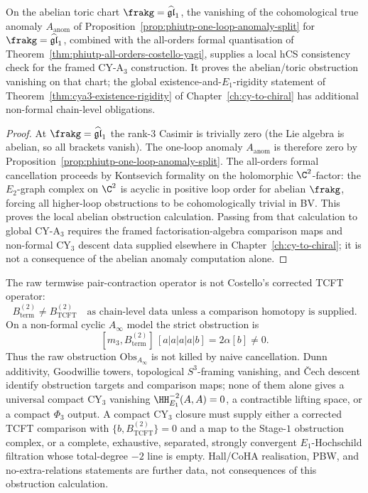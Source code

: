 \begin{corollary}
\label{cor:phiutp-cya3-anomaly-cancellation}
On the abelian toric chart $\frakg=\widehat{\mathfrak{gl}}_1$, the
vanishing of the cohomological true anomaly $A_{\mathrm{anom}}$ of
Proposition~\ref{prop:phiutp-one-loop-anomaly-split} for
$\frakg = \widehat{\mathfrak{gl}}_1$, combined with the all-orders
formal quantisation of Theorem~\ref{thm:phiutp-all-orders-costello-yagi},
supplies a local hCS consistency check for the framed CY-A$_3$
construction. It proves the abelian/toric obstruction vanishing on
that chart; the global existence-and-$E_1$-rigidity statement of
Theorem~\ref{thm:cya3-existence-rigidity} of
Chapter~\ref{ch:cy-to-chiral} has additional non-formal chain-level
obligations.
\end{corollary}

\begin{proof}
At $\frakg = \widehat{\mathfrak{gl}}_1$ the rank-$3$ Casimir is
trivially zero (the Lie algebra is abelian, so all brackets vanish).
The one-loop anomaly $A_{\mathrm{anom}}$ is therefore zero by
Proposition~\ref{prop:phiutp-one-loop-anomaly-split}. The all-orders
formal cancellation proceeds by Kontsevich formality on the holomorphic
$\C^2$-factor: the $E_2$-graph complex on $\C^2$ is acyclic in
positive loop order for abelian $\frakg$, forcing all higher-loop
obstructions to be cohomologically trivial in BV. This proves the
local abelian obstruction calculation. Passing from that calculation
to global CY-A$_3$ requires the framed factorisation-algebra comparison maps
and non-formal CY$_3$ descent data supplied elsewhere in
Chapter~\ref{ch:cy-to-chiral}; it is not a consequence of the abelian
anomaly computation alone.
\end{proof}

\begin{remark}
\label{rem:phiutp-compact-cy3-s3-closure}
The raw termwise pair-contraction operator is not Costello's corrected
TCFT operator:
\[
 B^{(2)}_{\mathrm{term}}\neq B^{(2)}_{\mathrm{TCFT}}
 \quad\text{as chain-level data unless a comparison homotopy is supplied.}
\]
On a non-formal cyclic \(A_\infty\) model the strict obstruction is
\[
 [m_3,B^{(2)}_{\mathrm{term}}]\,[a|a|a|a|b]
 =2\alpha[b]\neq0 .
\]
Thus the raw obstruction
\(\mathrm{Obs}_{A_\infty}\) is not killed by naive cancellation.
Dunn additivity, Goodwillie towers, topological \(S^3\)-framing
vanishing, and \v{C}ech descent identify obstruction targets and
comparison maps; none of them alone gives a universal compact CY$_3$
vanishing \(\HH^{-2}_{E_1}(A,A)=0\), a contractible lifting space, or a
compact \(\Phi_3\) output. A compact CY$_3$ closure must supply either
a corrected TCFT comparison with
\(\{b,B^{(2)}_{\mathrm{TCFT}}\}=0\) and a map to the Stage-$1$
obstruction complex, or a complete, exhaustive, separated, strongly
convergent \(E_1\)-Hochschild filtration whose total-degree \(-2\) line
is empty. Hall/CoHA realisation, PBW, and no-extra-relations statements
are further data, not consequences of this obstruction calculation.
\end{remark}

